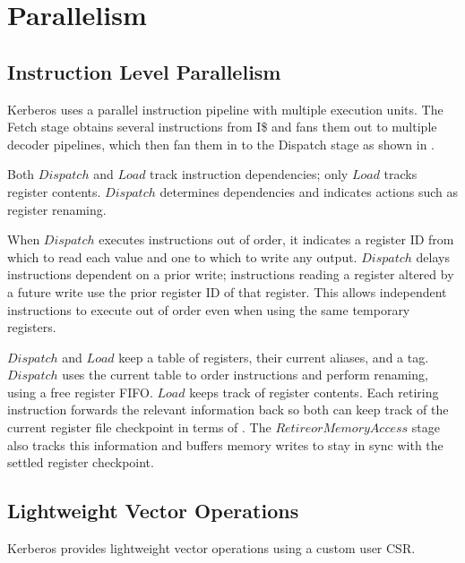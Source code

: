 \chapter{Parallelism}

\section{Instruction Level Parallelism}

Kerberos uses a parallel instruction pipeline with multiple execution units.
The Fetch stage obtains several instructions from I\$ and fans them out to
multiple decoder pipelines, which then fan them in to the Dispatch stage as
shown in .



Both $Dispatch$ and $Load$ track instruction dependencies; only $Load$ tracks
register contents.  $Dispatch$ determines dependencies and indicates actions
such as register renaming.

When $Dispatch$ executes instructions out of order, it indicates a register ID
from which to read each value and one to which to write any output.  $Dispatch$
delays instructions dependent on a prior write; instructions reading a register
altered by a future write use the prior register ID of that register.  This
allows independent instructions to execute out of order even when using the
same temporary registers.

$Dispatch$ and $Load$ keep a table of registers, their current aliases, and a
 tag.  $Dispatch$ uses the current table to order instructions
and perform renaming, using a free register FIFO.  $Load$ keeps track of
register contents.  Each retiring instruction forwards the relevant information
back so both can keep track of the current register file checkpoint in terms of
.  The $Retire or Memory Access$ stage also tracks this
information and buffers memory writes to stay in sync with the settled register
checkpoint.



\section{Lightweight Vector Operations}

Kerberos provides lightweight vector operations using a custom user CSR.

